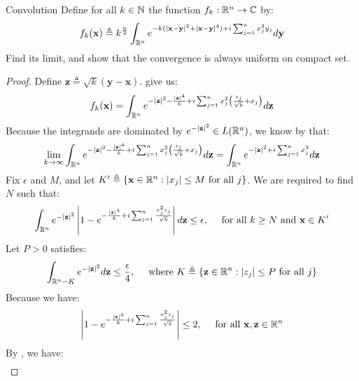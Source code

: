 \documentclass{report}
\begin{document}
\begin{question}{Convolution}{}
Define for all $k\in\mathbb{N}$ the function $f_k:\mathbb{R}^n \rightarrow \mathbb{C}$ by: 
\begin{align*}
f_k (\textbf{x})\triangleq k^{\frac{n}{2}}\int_{\mathbb{R}^n} e^{-k (\left|\textbf{x}-\textbf{y}\right|^2 + \left|\textbf{x}-\textbf{y}\right|^4)+ i \sum_{j=1}^n x_j^2y_j } d\textbf{y}
\end{align*}
Find its limit, and show that the convergence is always uniform on compact set.   
\end{question}
\begin{proof}
Define $\textbf{z} \triangleq \sqrt{k} (\textbf{y}-\textbf{x})$.  give us: 
\begin{align*}
f_k(\textbf{x})= \int_{\mathbb{R}^n} e^{- \left|\textbf{z}\right|^2  - \frac{\left|\textbf{z}\right|^4}{k}+ i \sum_{j=1}^n x_j^2 \left(\frac{z_j}{\sqrt{k} }+ x_j \right)}  d\textbf{z}
\end{align*}
Because the integrands are dominated by $e^{- \left|\textbf{z}\right|^2} \in L(\mathbb{R}^n)$, we know by  that: 
\begin{align*}
\lim_{k\to \infty}   \int_{\mathbb{R}^n} e^{- \left|\textbf{z}\right|^2  - \frac{\left|\textbf{z}\right|^4}{k}+ i \sum_{j=1}^n x_j^2 \left(\frac{z_j}{\sqrt{k} }+ x_j \right)}  d\textbf{z} = \int_{\mathbb{R}^n} e^{- \left|\textbf{z}\right|^2 + i \sum_{j=1}^n x_j^3} d\textbf{z}
\end{align*}
Fix $\epsilon $ and $M$, and let $K'\triangleq \left\{ \textbf{x}\in\mathbb{R}^n: \left|x_j\right|\leq M\text{ for all }j \right\}$. We are required to find $N$ such that:  
\begin{align*}
\label{EQbrn}
  \int_{\mathbb{R}^n} e^{- \left|\textbf{z}\right|^2} \left|1- e^{- \frac{\left|\textbf{z}\right|^4}{k}+ i\sum_{j=1}^n \frac{x_j^2z_j}{\sqrt{k} }}\right|  d\textbf{z} \leq \epsilon ,\quad \text{ for all }k\geq N\text{ and }\textbf{x}\in K'
\end{align*}
Let  $P>0$ satisfies: 
\begin{align}
\int_{\mathbb{R}^n-K} e^{- \left|\textbf{z}\right|^2} d\textbf{z}\leq  \frac{\epsilon }{4},\quad \text{ where }K \triangleq  \left\{ \textbf{z}\in\mathbb{R}^n: \left|z_j\right|\leq  P\text{ for all }j \right\}
\end{align}
Because we have: 
\begin{align*}
\left|1- e^{- \frac{\left|\textbf{z}\right|^4}{k} + i \sum_{j=1}^n \frac{x_j^2z_j}{\sqrt{k}} } \right|  \leq 2,\quad \text{ for all }\textbf{x},\textbf{z}\in\mathbb{R}^n
\end{align*}
By , we have: 
\begin{align*}

\end{align*}
\end{proof}
\end{document}
